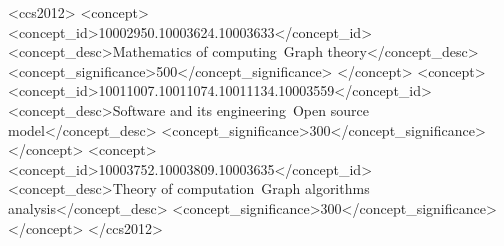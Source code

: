 \documentclass[sigconf,review,anonymous,nonacm=true]{acmart}
\begin{document}

\begin{CCSXML}
<ccs2012>
   <concept>
       <concept_id>10002950.10003624.10003633</concept_id>
       <concept_desc>Mathematics of computing~Graph theory</concept_desc>
       <concept_significance>500</concept_significance>
       </concept>
   <concept>
       <concept_id>10011007.10011074.10011134.10003559</concept_id>
       <concept_desc>Software and its engineering~Open source model</concept_desc>
       <concept_significance>300</concept_significance>
       </concept>
   <concept>
       <concept_id>10003752.10003809.10003635</concept_id>
       <concept_desc>Theory of computation~Graph algorithms analysis</concept_desc>
       <concept_significance>300</concept_significance>
       </concept>
 </ccs2012>
\end{CCSXML}






\maketitle
\end{document}
